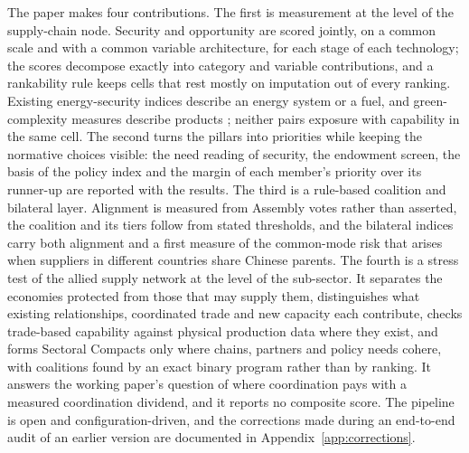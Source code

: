 The paper makes four contributions. The first is measurement at the level of the supply-chain
node. Security and opportunity are scored jointly, on a common scale and with a common variable
architecture, for each stage of each technology; the scores decompose exactly into category and
variable contributions, and a rankability rule keeps cells that rest mostly on imputation out of
every ranking. Existing energy-security indices describe an energy system or a fuel, and
green-complexity measures describe products \citep{mealy2022economic, growthlab2024greenplexity};
neither pairs exposure with capability in the same cell. The second turns the pillars into
priorities while keeping the normative choices visible: the need reading of security, the
endowment screen, the basis of the policy index and the margin of each member's priority over its
runner-up are reported with the results. The third is a rule-based coalition and bilateral layer.
Alignment is measured from Assembly votes rather than asserted, the coalition and its tiers
follow from stated thresholds, and the bilateral indices carry both alignment and a first measure
of the common-mode risk that arises when suppliers in different countries share Chinese parents.
The fourth is a stress test of the allied supply network at the level of the sub-sector. It
separates the economies protected from those that may supply them, distinguishes what existing
relationships, coordinated trade and new capacity each contribute, checks trade-based capability
against physical production data where they exist, and forms Sectoral Compacts only where chains,
partners and policy needs cohere, with coalitions found by an exact binary program rather than by
ranking. It answers the working paper's question of where coordination pays \citep{neis2026allied}
with a measured coordination dividend, and it reports no composite score. The pipeline is open and configuration-driven, and the
corrections made during an end-to-end audit of an earlier version are documented in
Appendix~\ref{app:corrections}.

